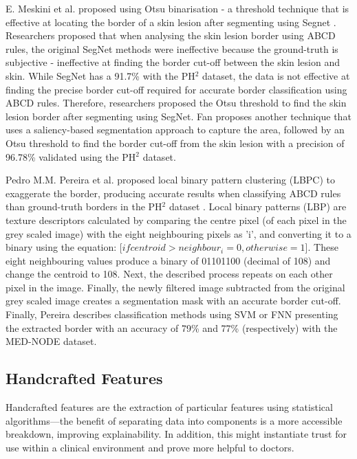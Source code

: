 \documentclass[10.5pt]{report}
\begin{document}
E. Meskini et al. proposed using Otsu binarisation - a threshold technique that is effective at locating the border of a skin lesion after segmenting using Segnet \cite{Meskini2018}. Researchers proposed that when analysing the skin lesion border using ABCD rules, the original SegNet methods were ineffective because the ground-truth is subjective - ineffective at finding the border cut-off between the skin lesion and skin. While SegNet has a 91.7\% with the PH$^2$ dataset, the data is not effective at finding the precise border cut-off required for accurate border classification using ABCD rules. Therefore, researchers proposed the Otsu threshold to find the skin lesion border after segmenting using SegNet. Fan proposes another technique that uses a saliency-based segmentation approach to capture the area, followed by an Otsu threshold \cite{Fan2017} to find the border cut-off from the skin lesion with a precision of 96.78\% validated using the PH$^2$ dataset.

Pedro M.M. Pereira et al. proposed local binary pattern clustering (LBPC) to exaggerate the border, producing accurate results when classifying ABCD rules than ground-truth borders in the PH$^2$ dataset \cite{Pereira2020}. Local binary patterns (LBP) are texture descriptors calculated by comparing the centre pixel (of each pixel in the grey scaled image) with the eight neighbouring pixels as 'i', and converting it to a binary using the equation:  [$if centroid > neighbour_i =  0, otherwise = 1$]. These eight neighbouring values produce a binary of 01101100 (decimal of 108) and change the centroid to 108. Next, the described process repeats on each other pixel in the image. Finally, the newly filtered image subtracted from the original grey scaled image creates a segmentation mask with an accurate border cut-off. Finally, Pereira describes classification methods using SVM or FNN presenting the extracted border with an accuracy of 79\% and 77\% (respectively) with the MED-NODE dataset.

\subsection{Handcrafted Features}
Handcrafted features are the extraction of particular features using statistical algorithms—the benefit of separating data into components is a more accessible breakdown, improving explainability. In addition, this might instantiate trust for use within a clinical environment and prove more helpful to doctors.
\end{document}
